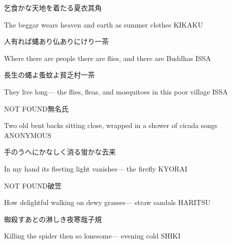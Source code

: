 \begin{haiku}
    {\FH 乞食かな天地を着たる夏衣}\hfill{\FH 其角}

    \vin{} The beggar
    \vin{} \vin{} wears heaven and earth
    \vin{} \vin{} \vin{} as summer clothes \hspace{\fill} KIKAKU
\end{haiku}

\begin{haiku}
    {\FH 人有れば蝿あり仏ありにけり}\hfill{\FH 一茶}

    \vin{} Where there are people
    \vin{} \vin{} there are flies, and
    \vin{} \vin{} \vin{} there are Buddhas \hspace{\fill} ISSA
\end{haiku}

\begin{haiku}
    {\FH 長生の蝿よ蚤蚊よ貧乏村}\hfill{\FH 一茶}

    \vin{} They live long---
    \vin{} \vin{} the flies, fleas, and mosquitoes
    \vin{} \vin{} \vin{} in this poor village \hspace{\fill} ISSA
\end{haiku}

\begin{haiku}
    {NOT FOUND}\hfill{\FH 無名氏}

    \vin{} Two old bent backs
    \vin{} \vin{} sitting close, wrapped in
    \vin{} \vin{} \vin{} a shower of cicada songs \hspace{\fill} ANONYMOUS
\end{haiku}

\begin{haiku}
    {\FH 手のうへにかなしく消る蛍かな}\hfill{\FH 去来}

    \vin{} In my hand
    \vin{} \vin{} its fleeting light vanishes---
    \vin{} \vin{} \vin{} the firefly \hspace{\fill} KYORAI
\end{haiku}

\begin{haiku}
    {NOT FOUND}\hfill{\FH 破笠}

    \vin{} How delightful
    \vin{} \vin{} walking on dewy grasses---
    \vin{} \vin{} \vin{} straw sandals \hspace{\fill} HARITSU
\end{haiku}

\begin{haiku}
    {\FH 蜘殺すあとの淋しき夜寒哉}\hfill{\FH 子規}

    \vin{} Killing the spider
    \vin{} \vin{} then so lonesome---
    \vin{} \vin{} \vin{} evening cold \hspace{\fill} SHIKI
\end{haiku}

